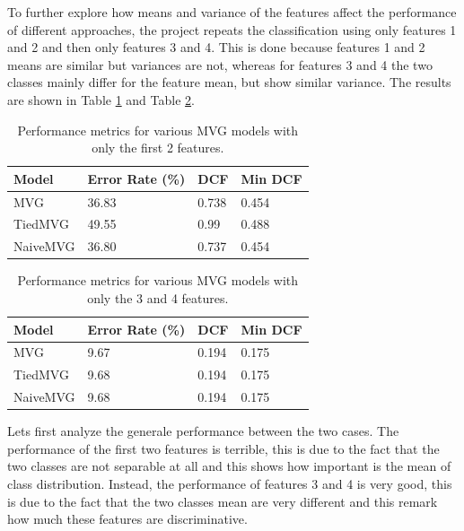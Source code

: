 \documentclass{article}
\begin{document}
To further explore how means and variance of the features affect the performance of different approaches, the project repeats the classification using only features 1 and 2 and then only features 3 and 4. This is done because features 1 and 2 means are similar but variances are not, whereas for features 3 and 4 the two classes mainly differ for the feature mean, but show similar variance. The results are shown in Table \ref{tab:mvg_performance_12} and Table \ref{tab:mvg_performance_34}.

\begin{table}[ht!]
    \centering
    \begin{tabularx}{\textwidth}{lXXX}
        \toprule
        \textbf{Model} & \textbf{Error Rate (\%)} & \textbf{DCF} & \textbf{Min DCF} \\
        \midrule
        MVG      & 36.83 & 0.738 & 0.454 \\
        TiedMVG  & 49.55 & 0.99  & 0.488 \\
        NaiveMVG & 36.80 & 0.737 & 0.454 \\
        \bottomrule
    \end{tabularx}
    \caption{Performance metrics for various MVG models with only the first 2 features.}
    \label{tab:mvg_performance_12}
\end{table}

\begin{table}[ht!]
    \centering
    \begin{tabularx}{\textwidth}{lXXX}
        \toprule
        \textbf{Model} & \textbf{Error Rate (\%)} & \textbf{DCF} & \textbf{Min DCF} \\
        \midrule
        MVG      & 9.67 & 0.194 & 0.175 \\
        TiedMVG  & 9.68 & 0.194 & 0.175 \\
        NaiveMVG & 9.68 & 0.194 & 0.175 \\
        \bottomrule
    \end{tabularx}
    \caption{Performance metrics for various MVG models with only the 3 and 4 features.}
    \label{tab:mvg_performance_34}
\end{table}

Lets first analyze the generale performance between the two cases. The performance of the first two features is terrible, this is due to the fact that the two classes are not separable at all and this shows how important is the mean of class distribution. Instead, the performance of features 3 and 4 is very good, this is due to the fact that the two classes mean are very different and this remark how much these features are discriminative.
\end{document}
